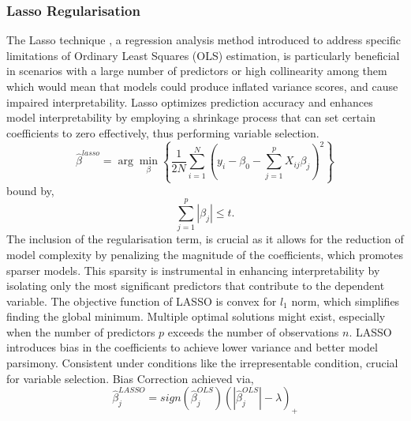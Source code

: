\subsubsection*{Lasso Regularisation}
\noindent The Lasso technique \parencite{tibshirani_regression_1996}, a regression analysis method introduced to address specific limitations of Ordinary Least Squares (OLS) estimation, is particularly beneficial in scenarios with a large number of predictors or high collinearity among them which would mean that models could produce inflated variance scores, and cause impaired interpretability. Lasso optimizes prediction accuracy and enhances model interpretability by employing a shrinkage process that can set certain coefficients to zero effectively, thus performing variable selection.
\begin{equation} \label{eq:lasso}\hat{\beta}^{lasso} = \arg \min_{\beta} \left\{ \frac{1}{2N} \sum_{i=1}^{N} (y_i - \beta_0 - \sum_{j=1}^{p} X_{ij}\beta_j)^2 \right\}\end{equation}
bound by,
\begin{equation} \label{eq:lassobound}\sum_{j=1}^{p} |\beta_j| \leq t.\end{equation}
\noindent \parencite{freijeirogonzalez_critical_2022} The inclusion of the regularisation term, is crucial as it allows for the reduction of model complexity by penalizing the magnitude of the coefficients, which promotes sparser models. This sparsity is instrumental in enhancing interpretability by isolating only the most significant predictors that contribute to the dependent variable. The objective function of LASSO is convex for \(l_{1}\) norm, which simplifies finding the global minimum. Multiple optimal solutions might exist, especially when the number of predictors \(p\) exceeds the number of observations \(n\). \parencite{freijeirogonzalez_critical_2022} LASSO introduces bias in the coefficients to achieve lower variance and better model parsimony. Consistent under conditions like the irrepresentable condition, crucial for variable selection. Bias Correction achieved via,
\begin{equation} \label{eq:lassobais}\hat{\beta}_{j}^{LASSO}=sign(\hat{\beta}_{j}^{OLS})(|\hat{\beta}_{j}^{OLS}| - \lambda)_{+}\end{equation}

